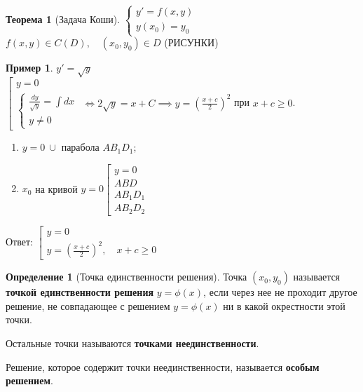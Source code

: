 \documentclass{report}
\theoremstyle{definition}
\newtheorem{definition}{Определение}[section]
\newtheorem{example}{Пример}
\newtheorem{theorem}{Теорема}[section]
\begin{document}
\begin{theorem}[Задача Коши]
    $\left\{\begin{array}{l}
            y'=f(x,y) \\
            y(x_0) = y_0
        \end{array}\right.$ \\

    $f(x,y) \in C(D), \quad (x_0, y_0) \in D$ (РИСУНКИ)
\end{theorem}

\begin{example}
    $y' = \sqrt{y}$ \\

    $\left[\begin{array}{l}
            y = 0 \\
            \left\{\begin{array}{l}
                       \frac{dy}{\sqrt{y}} = \int dx \\
                       y \ne 0
                   \end{array}\right.
        \end{array}\right. \iff 2\sqrt{y} = x + C \implies y = (\frac{x + c}{2})^2$ при $x + c \geqslant 0$. \\

    \begin{enumerate}
        \item $y = 0 \ \cup$ парабола $AB_1D_1$;
        \item $x_0$ на кривой $y = 0 \left[\begin{array}{l}
                      y = 0   \\
                      ABD     \\
                      AB_1D_1 \\
                      AB_2D_2
                  \end{array}\right.$
    \end{enumerate}

    Ответ: $\left[\begin{array}{l}
            y = 0 \\
            y = (\frac{x + c}{2})^2, \quad x + c \geqslant 0
        \end{array}\right.$
\end{example}

\begin{definition}[Точка единственности решения]
    Точка $(x_0, y_0)$ называется \textbf{точкой единственности решения} $y = \phi(x)$, если через нее не проходит другое решение, не совпадающее с решением $y = \phi(x)$ ни в какой окрестности этой точки.

    Остальные точки называются \textbf{точками неединственности}.

    Решение, которое содержит точки неединственности, называется \textbf{особым решением}.
\end{definition}
\end{document}
